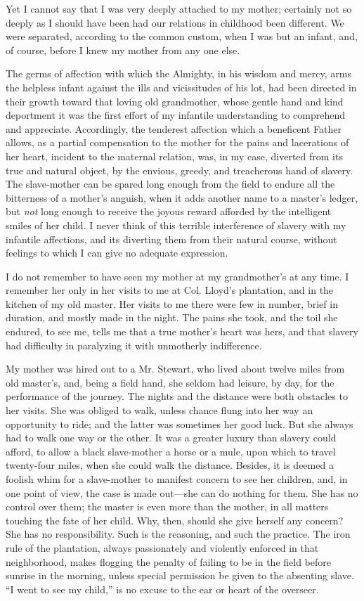 Yet I cannot say that I was very deeply attached to my mother; certainly
not so deeply as I should have been had our relations in childhood been
different. We were separated, according to the common custom, when I was
but an infant, and, of course, before I knew my mother from any one
else.

{}The germs of affection with which the Almighty, in his wisdom and
mercy, arms the helpless infant against the ills and vicissitudes of his
lot, had been directed in their growth toward that loving old
grandmother, whose gentle hand and kind deportment it was the first
effort of my infantile understanding to comprehend and appreciate.
Accordingly, the tenderest affection which a beneficent Father allows,
as a partial compensation to the mother for the pains and lacerations of
her heart, incident to the maternal relation, was, in my case, diverted
from its true and natural object, by the envious, greedy, and
treacherous hand of slavery. The slave-mother can be spared long enough
from the field to endure all the bitterness of a mother's anguish, when
it adds another name to a master's ledger, but \emph{not} long enough to
receive the joyous reward afforded by the intelligent smiles of her
child. I never think of this terrible interference of slavery with my
infantile affections, and its diverting them from their natural course,
without feelings to which I can give no adequate expression.

I do not remember to have seen my mother at my grandmother's at any
time. I remember her only in her visits to me at Col. Lloyd's
plantation, and in the kitchen of my old master. Her visits to me there
were few in number, brief in duration, and mostly made in the night. The
pains she took, and the toil she endured, to see me, tells me that a
true mother's heart was hers, and that slavery had difficulty in
paralyzing it with unmotherly indifference.

My mother was hired out to a Mr. Stewart, who lived about twelve miles
from old master's, and, {}being a field hand, she seldom had leisure, by
day, for the performance of the journey. The nights and the distance
were both obstacles to her visits. She was obliged to walk, unless
chance flung into her way an opportunity to ride; and the latter was
sometimes her good luck. But she always had to walk one way or the
other. It was a greater luxury than slavery could afford, to allow a
black slave-mother a horse or a mule, upon which to travel twenty-four
miles, when she could walk the distance. Besides, it is deemed a foolish
whim for a slave-mother to manifest concern to see her children, and, in
one point of view, the case is made out---she can do nothing for them.
She has no control over them; the master is even more than the mother,
in all matters touching the fate of her child. Why, then, should she
give herself any concern? She has no responsibility. Such is the
reasoning, and such the practice. The iron rule of the plantation,
always passionately and violently enforced in that neighborhood, makes
flogging the penalty of failing to be in the field before sunrise in the
morning, unless special permission be given to the absenting slave. ``I
went to see my child,'' is no excuse to the ear or heart of the
overseer.

